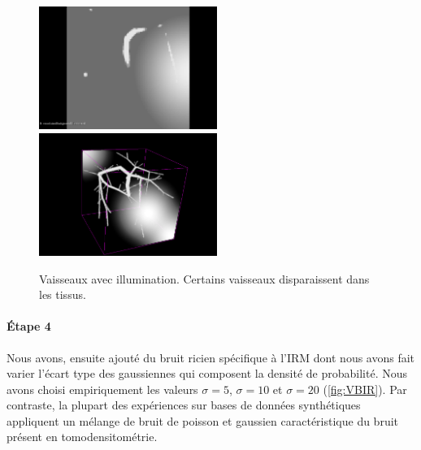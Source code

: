 \begin{figure}[!ht]
  \centering
  \includegraphics[height=4cm]{Images/2D_VBI.png}
  \includegraphics[height=4cm]{Images/3D_VBI.png}
  
  \caption{Vaisseaux avec illumination. Certains vaisseaux disparaissent dans les tissus.}
  \label{fig:VBI}
\end{figure}

\paragraph{Étape 4}

Nous avons, ensuite ajouté du bruit ricien spécifique à l'IRM dont nous avons fait varier l'écart type des gaussiennes qui composent la densité de probabilité. Nous avons choisi empiriquement les valeurs $\sigma=5$, $\sigma=10$ et $\sigma=20$ (\ref{fig:VBIR}). Par contraste, la plupart des expériences sur bases de données synthétiques appliquent un mélange de bruit de poisson et gaussien caractéristique du bruit présent en tomodensitométrie.


